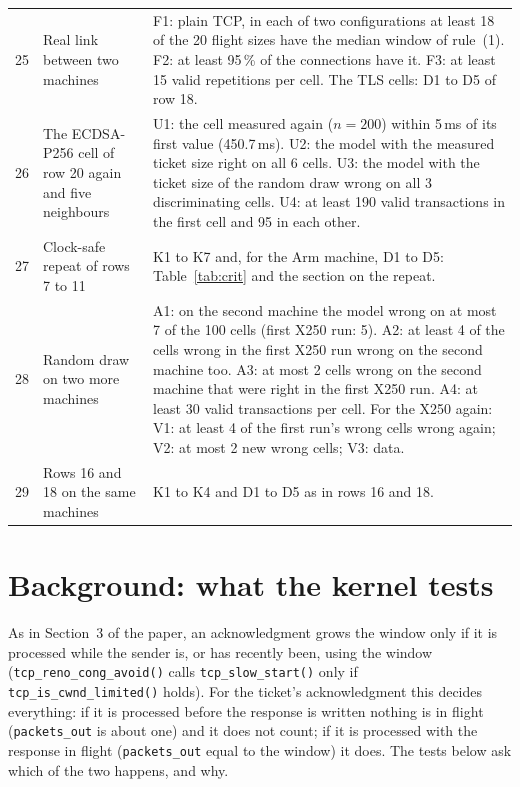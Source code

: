 \documentclass[9pt]{article}
\begin{document}
\begin{footnotesize}
\begin{longtable}{@{}p{}p{}p{}@{}}
25 & Real link between two machines & F1: plain TCP, in each of two configurations at least 18 of the 20 flight sizes have the median window of rule~(1). F2: at least 95\,\% of the connections have it. F3: at least 15 valid repetitions per cell. The TLS cells: D1 to D5 of row 18.\\
26 & The ECDSA-P256 cell of row 20 again and five neighbours & U1: the cell measured again ($n=200$) within 5\,ms of its first value (450.7\,ms). U2: the model with the measured ticket size right on all 6 cells. U3: the model with the ticket size of the random draw wrong on all 3 discriminating cells. U4: at least 190 valid transactions in the first cell and 95 in each other.\\
27 & Clock-safe repeat of rows 7 to 11 & K1 to K7 and, for the Arm machine, D1 to D5: Table~\ref{tab:crit} and the section on the repeat.\\
28 & Random draw on two more machines & A1: on the second machine the model wrong on at most 7 of the 100 cells (first X250 run: 5). A2: at least 4 of the cells wrong in the first X250 run wrong on the second machine too. A3: at most 2 cells wrong on the second machine that were right in the first X250 run. A4: at least 30 valid transactions per cell. For the X250 again: V1: at least 4 of the first run's wrong cells wrong again; V2: at most 2 new wrong cells; V3: data.\\
29 & Rows 16 and 18 on the same machines & K1 to K4 and D1 to D5 as in rows 16 and 18.\\
\end{longtable}
\end{footnotesize}

\section*{Background: what the kernel tests}
As in Section~3 of the paper, an acknowledgment grows the window only if it is processed while the sender is, or has recently been, using the window (\texttt{tcp\_reno\_cong\_avoid()} calls \texttt{tcp\_slow\_start()} only if \texttt{tcp\_is\_cwnd\_limited()} holds). For the ticket's acknowledgment this decides everything: if it is processed before the response is written nothing is in flight (\texttt{packets\_out} is about one) and it does not count; if it is processed with the response in flight (\texttt{packets\_out} equal to the window) it does. The tests below ask which of the two happens, and why.
\end{document}
